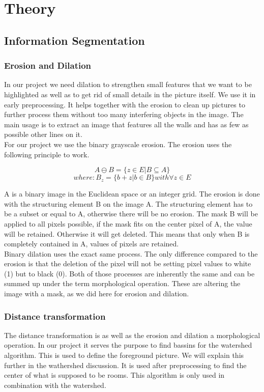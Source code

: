 \section{Theory}
\subsection{Information Segmentation}
\subsubsection{Erosion and Dilation}
\label{subsubsec:Erosion and Dilation}
In our project we need dilation to strengthen small features that we want to be highlighted as well as to get rid of small details in the picture itself. We use it in early preprocessing. It helps together with the erosion to clean up pictures to further process them without too many interfering objects in the image. The main usage is to extract an image that features all the walls and has as few as possible other lines on it. \cite{burger_burge_2016}
\\
For our project we use the binary grayscale erosion.
The erosion uses the following principle to work.


\[A \ominus B = \{ z\in E | B \subseteq A \}\]  
\[where: B_{z} = \{b+z | b \in B\} with \forall z \in E \]

A is a binary image in the Euclidean space or an integer grid. The erosion is done with the structuring element B on the image A. The structuring element has to be a subset or equal to A, otherwise there will be no erosion. The mask B will be applied to all pixels possible, if the mask fits on the center pixel of A, the value will be retained. Otherwise it will get deleted. This means that only when B is completely contained in A, values of pixels are retained.
\\
Binary dilation uses the exact same process. The only difference compared to the erosion is that the deletion of the pixel will not be setting pixel values to white (1) but to black (0). Both of those processes are inherently the same and can be summed up under the term morphological operation. These are altering the image with a mask, as we did here for erosion and dilation.




\subsubsection{Distance transformation}
\label{subsubsec:Distance transformation}
The distance transformation is as well as the erosion and dilation a morphological operation. In our project it serves the purpose to find bassins for the watershed algorithm. This is used to define the foreground picture. We will explain this further in the wathershed discussion.
It is used after preprocessing to find the center of what is supposed to be rooms. This algorithm is only used in combination with the watershed.

